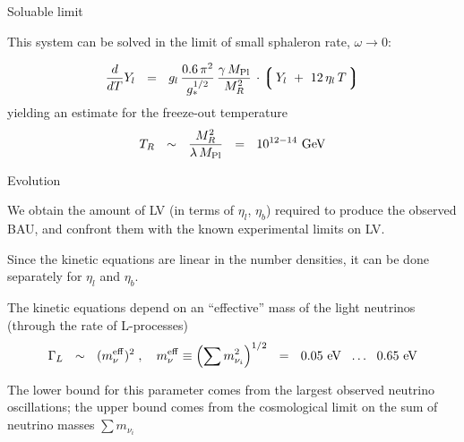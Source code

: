 \documentclass[pdf,UofT06talk,slideColor,colorBG,accumulate]{prosper}
\newcommand{\lgr}{\left\lgroup}
\newcommand{\rgr}{\right\rgroup}
\newcommand{\GeV}{{\rm GeV}}
\newcommand{\Mpl}{M_{\rm Pl}}
\newcommand{\meff}{m^{\rm eff}_\nu}
\newcommand{\eV}{{\rm eV}}
\begin{document}
\begin{slide}{Soluable limit}

	This system can be solved in the limit of small
	sphaleron rate, $ \omega \to 0 $:

\[
	\frac{d}{dT}Y_l ~~=~~ 
	g_l\,
	\frac{0.6\,\pi^2}{g_*^{1/2}}\, 
	\frac{\gamma\,\Mpl}{M_R^2}\,
	\cdot \lgr\, Y_l ~+~ 12\,\eta_l\,T\, \rgr
\]
	yielding an estimate for the freeze-out temperature
\[
	T_R ~~\sim~~ 
	\frac { M_R^2} { \lambda\, \Mpl }
	~~=~~ 10^{12-14}~\GeV
\]
	
\end{slide}

\begin{slide}{Evolution}

	We obtain the amount of LV (in terms of $ \eta_l $, $ \eta_b $)
	required to produce the observed BAU, and confront them
	with the known experimental limits on LV.

	\vspace{0.2cm}
	Since the kinetic equations are linear in the number densities,
	it can be done separately for $ \eta_l $ and $ \eta_b $.

	\vspace{0.2cm}
	The kinetic equations depend on an ``effective'' mass of the
	light neutrinos  (through the rate of L-processes)
\[	
	\Gamma_L ~~\sim~~ (\meff)^2\;,
	\quad
	\meff \equiv \left( \sum m_{\nu_i}^2 \right)^{1/2} 
	~~=~~
	0.05~\eV~~\dots~~0.65~\eV
\]

	The lower bound for this parameter comes from the largest
	observed neutrino oscillations;
	the upper bound comes from the cosmological limit on the sum
	of neutrino masses $ \sum m_{\nu_i} $

\end{slide}
\end{document}
